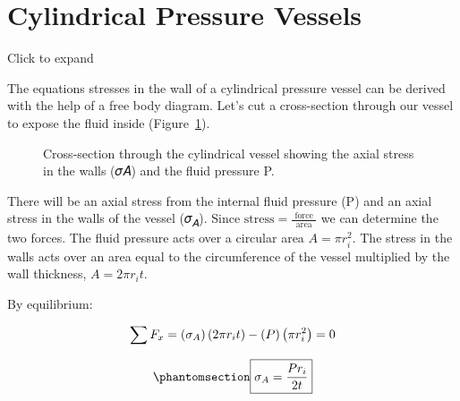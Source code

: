 \documentclass[
  letterpaper,
  DIV=11,
  numbers=noendperiod]{scrreprt}
\theoremstyle{definition}
\theoremstyle{remark}
\begin{document}
\section{Cylindrical Pressure Vessels}\label{sec-13.1}

Click to expand

The equations stresses in the wall of a cylindrical pressure vessel can
be derived with the help of a free body diagram. Let's cut a
cross-section through our vessel to expose the fluid inside
(Figure~\ref{fig-13.3}).

\begin{figure}


\caption{\label{fig-13.3}Cross-section through the cylindrical vessel
showing the axial stress in the walls (𝜎𝐴) and the fluid pressure P.}

\end{figure}%

There will be an axial stress from the internal fluid pressure (P) and
an axial stress in the walls of the vessel (𝜎\textsubscript{𝐴}). Since
\(\text{stress}=\frac{\text { force }}{\text { area }}\) we can
determine the two forces. The fluid pressure acts over a circular area
\(A=\pi r_i^2\). The stress in the walls acts over an area equal to the
circumference of the vessel multiplied by the wall thickness,
\(A=2 \pi r_i t\).

By equilibrium:

\[
\sum F_x=\left(\sigma_A\right)\left(2 \pi r_i t\right)-(P)\left(\pi r_i^2\right)=0 \\
\]

\begin{equation}\phantomsection\label{eq-13.1}{
\boxed{\sigma_A=\frac{P r_i}{2 t}}
}\end{equation}
\end{document}
